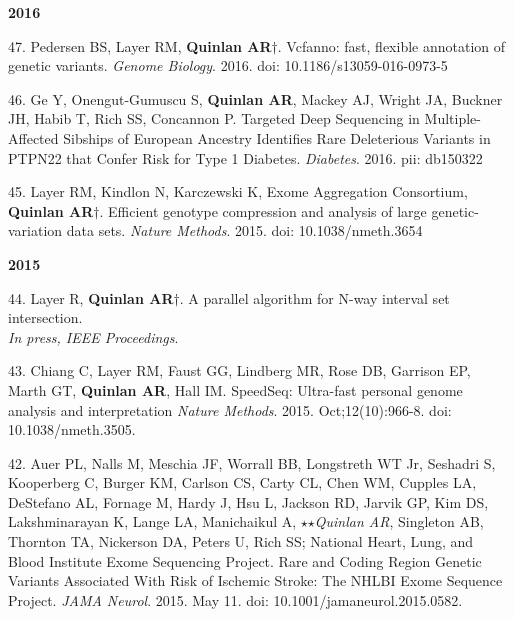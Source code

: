 \documentclass[margin,line]{cv}
\begin{document}
\begin{resume}
\begin{list}{*}{}
    \end{list}


    \textbf{2016} \\

    \begin{list}{*}{}

    \item[47.] Pedersen BS, Layer RM, \textbf{Quinlan AR}$\dagger$.
    Vcfanno: fast, flexible annotation of genetic variants. \emph{Genome Biology}. 2016. doi: 10.1186/s13059-016-0973-5

    \item[46.] Ge Y, Onengut-Gumuscu S, \textbf{Quinlan AR}, Mackey AJ, Wright JA, Buckner JH, Habib T, Rich SS, Concannon P.
    Targeted Deep Sequencing in Multiple-Affected Sibships of European Ancestry Identifies Rare Deleterious Variants in PTPN22 that Confer Risk for Type 1 Diabetes. \emph{Diabetes}. 2016. pii: db150322

    \item[45.] Layer RM, Kindlon N, Karczewski K, Exome Aggregation Consortium, \textbf{Quinlan AR}$\dagger$.
    Efficient genotype compression and analysis of large genetic-variation data sets.
    \emph{Nature Methods}. 2015. doi: 10.1038/nmeth.3654

    \end{list}
    

    \textbf{2015} \\

    \begin{list}{*}{}

    \item[44.] Layer R, \textbf{Quinlan AR}$\dagger$.
    A parallel algorithm for N-way interval set intersection.\\
    \emph{In press, IEEE Proceedings}.

    \item[43.] Chiang C, Layer RM, Faust GG, Lindberg MR, Rose DB, Garrison EP, Marth GT, \textbf{Quinlan AR}, Hall IM.
    SpeedSeq: Ultra-fast personal genome analysis and interpretation
    \emph{Nature Methods}. 2015. Oct;12(10):966-8. doi: 10.1038/nmeth.3505.

    \item[42.] Auer PL, Nalls M, Meschia JF, Worrall BB, Longstreth WT Jr, Seshadri S, Kooperberg C, Burger KM, Carlson CS,
    Carty CL, Chen WM, Cupples LA, DeStefano AL, Fornage M, Hardy J, Hsu L, Jackson RD, Jarvik GP, Kim DS,
    Lakshminarayan K, Lange LA, Manichaikul A,  $\star$$\star$\textit{Quinlan AR}, Singleton AB, Thornton TA,
    Nickerson DA, Peters U, Rich SS; National Heart, Lung, and Blood Institute Exome Sequencing Project.
    Rare and Coding Region Genetic Variants Associated With Risk of Ischemic Stroke: The NHLBI Exome Sequence Project.
    \emph{JAMA Neurol}. 2015. May 11. doi: 10.1001/jamaneurol.2015.0582.


\end{list}
\end{resume}
\end{document}
